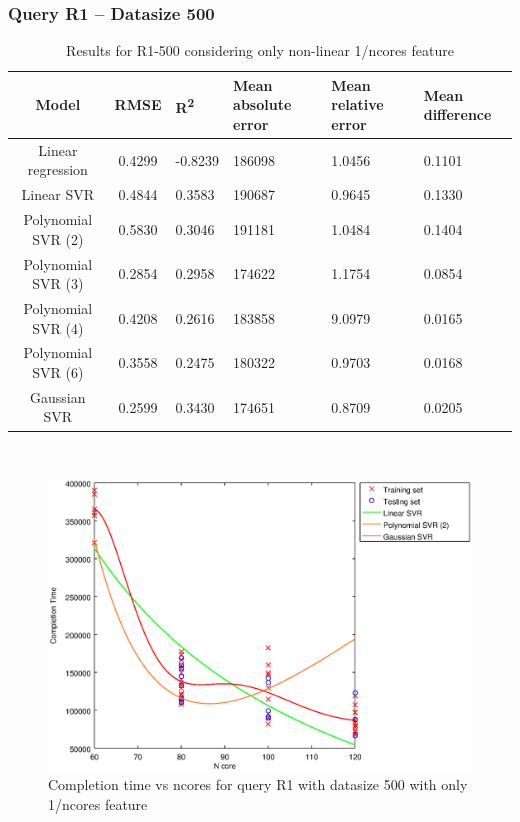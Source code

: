 \documentclass[a4paper,11pt]{article}
\begin{document}
\newpage
\subsubsection{Query R1 -- Datasize 500}
\begin{table}[H]
	\centering
	\begin{adjustbox}{center}
		\begin{tabular}{c | c M{1.2cm} M{2.5cm} M{2.5cm} M{1.8cm}}
			Model & RMSE & R\textsuperscript{2} & Mean absolute error & Mean relative error & Mean difference \tabularnewline
			\hline
			Linear regression & 0.4299 & -0.8239 & 186098 & 1.0456 & 0.1101 \\
			Linear SVR & 0.4844 & 0.3583 & 190687 & 0.9645 & 0.1330 \\
			Polynomial SVR (2) & 0.5830 & 0.3046 & 191181 & 1.0484 & 0.1404 \\
			Polynomial SVR (3) & 0.2854 & 0.2958 & 174622 & 1.1754 & 0.0854 \\
			Polynomial SVR (4) & 0.4208 & 0.2616 & 183858 & 9.0979 & 0.0165 \\
			Polynomial SVR (6) & 0.3558 & 0.2475 & 180322 & 0.9703 & 0.0168 \\
			Gaussian SVR & 0.2599 & 0.3430 & 174651 & 0.8709 & 0.0205 \\
		\end{tabular}
	\end{adjustbox}
	\\
	\caption{Results for R1-500 considering only non-linear 1/ncores feature}
	\label{table_R1_prediction_all}
\end{table}

\begin {figure}[hbtp]
\centering
\includegraphics[width=\textwidth]{output/R1_500_ONLY_1_OVER_NCORES/plot_R1_500_bestmodels.eps}
\caption {Completion time vs ncores for query R1 with datasize 500 with only 1/ncores feature}
\end {figure}
\end{document}
